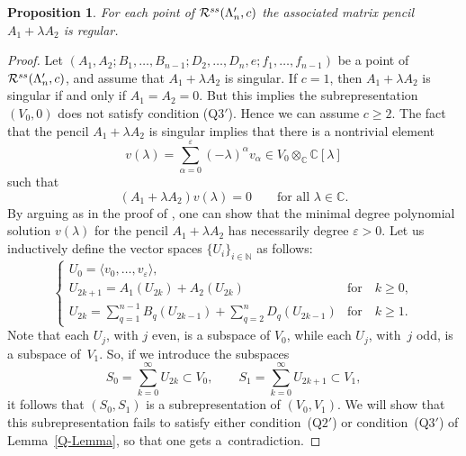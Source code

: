 \documentclass[11pt]{article}
\numberwithin{equation}{section}
\numberwithin{equation}{section}
\newtheorem{Proposition}[Theorem]{Proposition}
 { \theoremstyle{definition}
\newtheorem{Definition}[Theorem]{Definition}
\newtheorem{Remark}[Theorem]{Remark} }
\begin{document}
\begin{Proposition}\label{prop-regular-in-R'}
For each point of $\mathcal{R}^{\rm ss}(\Lambda'_{n}, c)$ the associated matrix pencil $A_{1}+\lambda A_{2}$ is regular.
\end{Proposition}
\begin{proof}
Let $(A_1,A_2;B_1,\dots,B_{n-1};D_{2},\dots,D_{n},e;f_1,\dots,f_{n-1})$ be a point of $\mathcal{R}^{\rm ss}(\Lambda'_{n}, c)$,
and assume that $A_{1}+\lambda A_{2}$ is singular.
If $c=1$, then $A_{1}+\lambda A_{2}$ is singular if and only if $A_{1}=A_{2}=0$. But this implies the subrepresentation
$(V_0,0)$ does not satisfy condition (Q$3'$). Hence we can assume $c\geq 2$.
The fact that the pencil $A_{1}+\lambda A_{2}$ is singular implies that
there is a nontrivial element
\begin{equation}
v(\lambda)=\sum_{\alpha=0}^{\varepsilon}(-\lambda)^{\alpha}v_{\alpha} \in V_0\otimes_{\mathbb{C}}\mathbb{C}[\lambda]
\label{eq-v(l)}
\end{equation}
such that
\begin{equation}
(A_{1}+\lambda A_{2})v(\lambda)=0\qquad\text{for all $\lambda\in\mathbb{C}$.}
\label{eq-Av(l)}
\end{equation}
By arguing as in the proof of \cite[Lemma~4.11]{bblr}, one can show that the minimal degree
polynomial solution $v(\lambda)$ for the pencil $A_{1}+\lambda A_{2}$ has necessarily degree $\varepsilon >0$.
Let us inductively define the vector spaces $\{U_{i}\}_{i\in \mathbb{N}}$ as follows:
\begin{equation*}
 \begin{cases}
 U_{0}=\langle v_{0},\dots,v_{\varepsilon}\rangle, & \\
 U_{2k+1}=A_{1}(U_{2k})+A_{2}(U_{2k}) &\text{for}\quad k\geq0,\\
 \displaystyle U_{2k}=\sum\limits_{q=1}^{n-1}B_{q}(U_{2k-1})+\sum\limits_{q=2}^{n}D_{q}(U_{2k-1}) &\text{for}\quad k\geq1 .
\end{cases}
\end{equation*}
Note that each $U_{j}$, with $j$ even, is a subspace of $V_0$, while each $U_{j}$, with~$j$ odd, is a subspace of~$V_1$. So, if we introduce the subspaces
\begin{equation*}
S_{0}=\sum_{k=0}^{\infty}U_{2k} \subset V_0 ,\qquad S_{1}=\sum_{k=0}^{\infty}U_{2k+1}\subset V_1 ,
\end{equation*}
it follows that $(S_{0},S_{1})$ is a subrepresentation of $(V_0, V_1)$. We will show that this subrepresentation fails to satisfy either condition~(Q$2'$) or condition~(Q$3'$) of Lemma~\ref{Q-Lemma}, so that one gets a~contradiction.


\end{proof}
\end{document}

